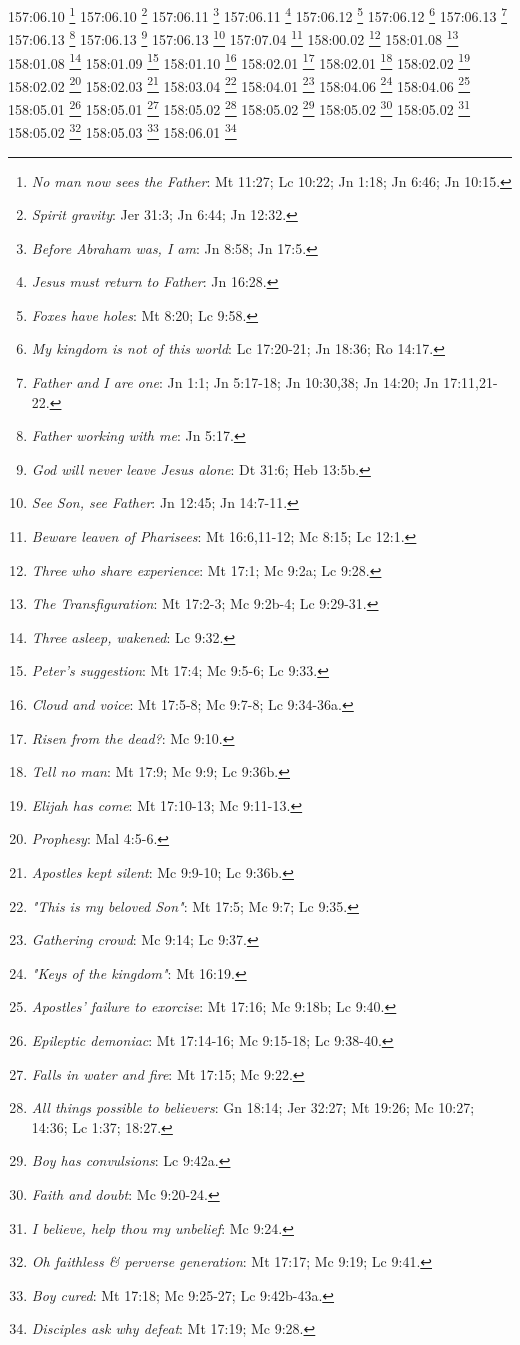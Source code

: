 157:06.10 \footnote{\textit{No man now sees the Father}: Mt 11:27; Lc 10:22; Jn 1:18; Jn 6:46; Jn 10:15.}
157:06.10 \footnote{\textit{Spirit gravity}: Jer 31:3; Jn 6:44; Jn 12:32.}
157:06.11 \footnote{\textit{Before Abraham was, I am}: Jn 8:58; Jn 17:5.}
157:06.11 \footnote{\textit{Jesus must return to Father}: Jn 16:28.}
157:06.12 \footnote{\textit{Foxes have holes}: Mt 8:20; Lc 9:58.}
157:06.12 \footnote{\textit{My kingdom is not of this world}: Lc 17:20-21; Jn 18:36; Ro 14:17.}
157:06.13 \footnote{\textit{Father and I are one}: Jn 1:1; Jn 5:17-18; Jn 10:30,38; Jn 14:20; Jn 17:11,21-22.}
157:06.13 \footnote{\textit{Father working with me}: Jn 5:17.}
157:06.13 \footnote{\textit{God will never leave Jesus alone}: Dt 31:6; Heb 13:5b.}
157:06.13 \footnote{\textit{See Son, see Father}: Jn 12:45; Jn 14:7-11.}
157:07.04 \footnote{\textit{Beware leaven of Pharisees}: Mt 16:6,11-12; Mc 8:15; Lc 12:1.}
158:00.02 \footnote{\textit{Three who share experience}: Mt 17:1; Mc 9:2a; Lc 9:28.}
158:01.08 \footnote{\textit{The Transfiguration}: Mt 17:2-3; Mc 9:2b-4; Lc 9:29-31.}
158:01.08 \footnote{\textit{Three asleep, wakened}: Lc 9:32.}
158:01.09 \footnote{\textit{Peter's suggestion}: Mt 17:4; Mc 9:5-6; Lc 9:33.}
158:01.10 \footnote{\textit{Cloud and voice}: Mt 17:5-8; Mc 9:7-8; Lc 9:34-36a.}
158:02.01 \footnote{\textit{Risen from the dead?}: Mc 9:10.}
158:02.01 \footnote{\textit{Tell no man}: Mt 17:9; Mc 9:9; Lc 9:36b.}
158:02.02 \footnote{\textit{Elijah has come}: Mt 17:10-13; Mc 9:11-13.}
158:02.02 \footnote{\textit{Prophesy}: Mal 4:5-6.}
158:02.03 \footnote{\textit{Apostles kept silent}: Mc 9:9-10; Lc 9:36b.}
158:03.04 \footnote{\textit{"This is my beloved Son"}: Mt 17:5; Mc 9:7; Lc 9:35.}
158:04.01 \footnote{\textit{Gathering crowd}: Mc 9:14; Lc 9:37.}
158:04.06 \footnote{\textit{"Keys of the kingdom"}: Mt 16:19.}
158:04.06 \footnote{\textit{Apostles' failure to exorcise}: Mt 17:16; Mc 9:18b; Lc 9:40.}
158:05.01 \footnote{\textit{Epileptic demoniac}: Mt 17:14-16; Mc 9:15-18; Lc 9:38-40.}
158:05.01 \footnote{\textit{Falls in water and fire}: Mt 17:15; Mc 9:22.}
158:05.02 \footnote{\textit{All things possible to believers}: Gn 18:14; Jer 32:27; Mt 19:26; Mc 10:27; 14:36; Lc 1:37; 18:27.}
158:05.02 \footnote{\textit{Boy has convulsions}: Lc 9:42a.}
158:05.02 \footnote{\textit{Faith and doubt}: Mc 9:20-24.}
158:05.02 \footnote{\textit{I believe, help thou my unbelief}: Mc 9:24.}
158:05.02 \footnote{\textit{Oh faithless & perverse generation}: Mt 17:17; Mc 9:19; Lc 9:41.}
158:05.03 \footnote{\textit{Boy cured}: Mt 17:18; Mc 9:25-27; Lc 9:42b-43a.}
158:06.01 \footnote{\textit{Disciples ask why defeat}: Mt 17:19; Mc 9:28.}
